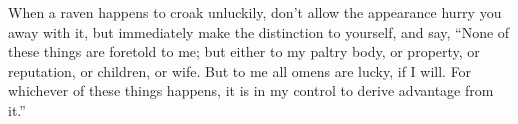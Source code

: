 When a raven happens to croak unluckily, don't allow the appearance
hurry you away with it, but immediately make the distinction to yourself,
and say, ``None of these things are foretold to me; but either to my
paltry body, or property, or reputation, or children, or wife. But
to me all omens are lucky, if I will. For whichever of these things
happens, it is in my control to derive advantage from it.''
